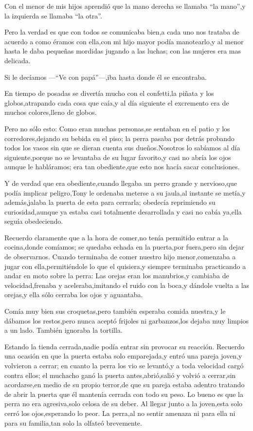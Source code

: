 \documentclass[letterpaper,12pt]{book}
\begin{document}
Con el menor de mis hijos aprendió que la mano derecha se llamaba ``la mano'',y la izquierda se llamaba ``la otra''. 

Pero la verdad es que con todos se comunicaba bien,a cada uno nos trataba de acuerdo a como éramos con ella,con mi hijo mayor podía manotearlo,y al menor hasta le daba pequeñas mordidas jugando a las luchas; con las mujeres era mas delicada.  

Si le decíamos ---``Ve con papá''---,iba hasta donde él se encontraba.

En tiempo de posadas se divertía mucho con el confetti,la piñata y los globos,atrapando cada cosa que caía,y al día siguiente el excremento era de muchos colores,lleno de globos. 

Pero no sólo esto: Como eran muchas personas,se sentaban en el patio y los corredores,dejando su bebida en el piso; la perra pasaba por detrás probando todos los vasos sin que se dieran cuenta sus dueños.Nosotros lo sabíamos al día siguiente,porque no se levantaba de su lugar favorito,y casi no abría los ojos aunque le habláramos; era tan obediente,que esto nos hacía sacar conclusiones.

Y de verdad que era obediente,cuando llegaba un perro grande y nervioso,que podía implicar peligro,Tony le ordenaba meterse a su jaula,al instante se metía,y además,jalaba la puerta de esta para cerrarla; obedecía reprimiendo su curiosidad,aunque ya estaba casi totalmente desarrollada y casi no cabía ya,ella seguía obedeciendo.

Recuerdo claramente que a la hora de comer,no tenía permitido entrar a la cocina,donde comíamos; se quedaba echada en la puerta,por fuera,pero sin dejar de observarnos. Cuando terminaba de comer nuestro hijo menor,comenzaba a jugar con ella,permitiéndole lo que el quisiera,y siempre terminaba practicando a andar en moto sobre la perra: Las orejas eran los manubrios,y cambiaba de velocidad,frenaba y aceleraba,imitando el ruido con la boca,y dándole vuelta a las orejas,y ella sólo cerraba los ojos y aguantaba.

Comía muy bien sus croquetas,pero también esperaba comida nuestra,y le dábamos los restos,pero nunca aceptó frijoles ni garbanzos,los dejaba muy limpios a un lado. También ignoraba la tortilla.

Estando la tienda cerrada,nadie podía entrar sin provocar su reacción. Recuerdo una ocasión en que la puerta estaba solo emparejada,y entró una pareja joven,y volvieron a cerrar; en cuanto la perra los vio se levantó,y a toda velocidad cargó contra ellos; el muchacho ganó la puerta antes,abrió,salió y volvió a cerrar,sin acordarse,en medio de su propio terror,de que su pareja estaba adentro tratando de abrir la puerta que él mantenía cerrada con todo su peso. Lo bueno es que la perra no era agresiva,solo celosa de su deber. Al llegar junto a la joven,esta solo cerró los ojos,esperando lo peor. La perra,al no sentir amenaza ni para ella ni para su familia,tan solo la olfateó brevemente.
\end{document}
